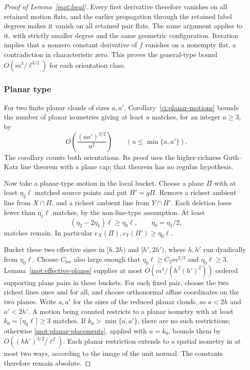 \begin{proof}[Proof of Lemma~\ref{mot:local}]
Every first derivative therefore vanishes on all retained motion
flats, and the earlier propagation through the retained label
degrees makes it vanish on all retained pair flats.  The same
argument applies to it, with strictly smaller degree and the same
geometric configuration.  Iteration implies that a nonzero constant
derivative of \(f\) vanishes on a nonempty flat, a contradiction
in characteristic zero.  This proves the general-type bound
\(O(m^3/\ell^{3/2})\) for each orientation class.

\subsubsection{Planar type}

For two finite planar clouds of sizes \(a,a'\),
Corollary~\ref{ci:planar-motions} bounds the number of planar
isometries giving at least \(u\) matches, for an integer \(u\ge3\), by
\begin{equation}
\label{mot:planar-placements}
 O\left(\frac{(aa')^{3/2}}{u^2}\right)
 \qquad (u\le\min\{a,a'\}).
\end{equation}
The corollary counts both orientations.  Its proof uses the
higher-richness Guth--Katz line theorem
\cite[Theorem~4.5]{guthkatz2015} with a plane cap; that theorem has no
regulus hypothesis.

Now take a planar-type motion in the local bucket.  Choose a plane
\(\Pi\) with at least \(\eta_2\ell\) matched source points and
put \(\Pi'=g\Pi\).  Remove a richest ambient line from
\(X\cap\Pi\), and a richest ambient line from \(Y\cap\Pi'\).
Each deletion loses fewer than \(\eta_1\ell\) matches, by the
non-line-type assumption.  At least
\[
 (\eta_2-2\eta_1)\ell\ge\eta_0\ell,
 \qquad \eta_0=\eta_2/2,
\]
matches remain.  In particular
\(e_X(\Pi),e_Y(\Pi')\ge\eta_0\ell\).

Bucket these two effective sizes in \([h,2h)\) and \([h',2h')\),
where \(h,h'\) run dyadically from \(\eta_0\ell\).
Choose \(C_{\mathrm{loc}}\) also large enough that
\(\eta_0\ell\ge C_2m^{2/3}\) and \(\eta_0\ell\ge3\).
Lemma~\ref{mot:effective-planes} supplies at most
\(O(m^4/(h^2(h')^2))\) ordered supporting plane pairs in these
buckets.  For each fixed pair, choose the two richest lines once
and for all, and choose orthonormal affine coordinates on the two
planes.  Write \(a,a'\) for the sizes of the reduced planar clouds,
so \(a<2h\) and \(a'<2h'\).  A motion being counted restricts to a
planar isometry with at least
\(k_0=\lceil\eta_0\ell\rceil\ge3\) matches.  If
\(k_0>\min\{a,a'\}\), there are no such restrictions; otherwise
\eqref{mot:planar-placements}, applied with \(u=k_0\), bounds them by
\(O((hh')^{3/2}/\ell^2)\).  Each planar restriction extends to a
spatial isometry in at most two ways, according to the image of the
unit normal.  The constants therefore remain absolute.


\end{proof}
